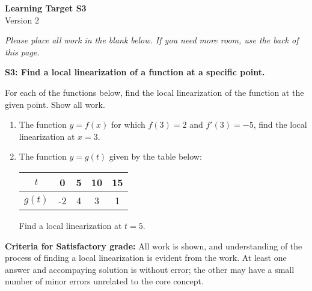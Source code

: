 \documentclass[10pt]{article}
\begin{document}
	\vspace*{0in}

		\begin{center}
			\textbf{Learning Target S3} \\
			{Version 2} \\
		\end{center}

\emph{Please place all work in the blank below. If you need more room, use the back of this page.}

\begin{framed}
	\textbf{S3: Find a local linearization of a function at a specific point.}
\end{framed}

For each of the functions below, find the local linearization of the function at the given point. Show all work. 

\begin{enumerate}
    \item The function $y = f(x)$ for which $f(3) = 2$ and $f'(3) = -5$, find the local linearization at $x=3$.
    
    \item The function $y = g(t)$ given by the table below: 
    \begin{center}
            \begin{tabular}{c||c|c|c|c|}
        $t$ &  0 & 5 & 10 & 15  \\ \hline 
        $g(t)$ & -2 & 4 & 3 & 1 
    \end{tabular}
    \end{center}
    Find a local linearization at $t = 5$. 

    
    
\end{enumerate}



\vfill


\begin{small}
    \begin{framed}
        	\textbf{Criteria for Satisfactory grade:} All work is shown, and understanding of the process of finding a local linearization is evident from the work. At least one answer and accompaying solution is without error; the other may have a small number of minor errors unrelated to the core concept. 
    \end{framed}

\end{small}
\end{document}

